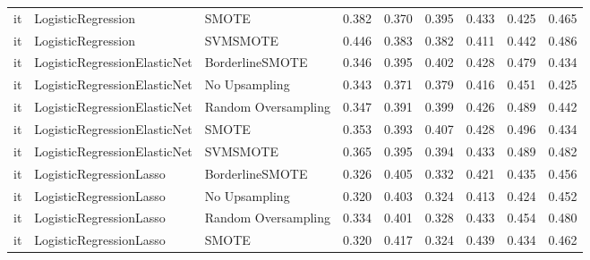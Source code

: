 \begin{tabular}{lllllllll}
      it &           LogisticRegression &               SMOTE & 0.382 &                     0.370 &                 0.395 &                  0.433 &                                   0.425 &     0.465 \\
      it &           LogisticRegression &            SVMSMOTE & 0.446 &                     0.383 &                 0.382 &                  0.411 &                                   0.442 &     0.486 \\
      it & LogisticRegressionElasticNet &     BorderlineSMOTE & 0.346 &                     0.395 &                 0.402 &                  0.428 &                                   0.479 &     0.434 \\
      it & LogisticRegressionElasticNet &       No Upsampling & 0.343 &                     0.371 &                 0.379 &                  0.416 &                                   0.451 &     0.425 \\
      it & LogisticRegressionElasticNet & Random Oversampling & 0.347 &                     0.391 &                 0.399 &                  0.426 &                                   0.489 &     0.442 \\
      it & LogisticRegressionElasticNet &               SMOTE & 0.353 &                     0.393 &                 0.407 &                  0.428 &                                   0.496 &     0.434 \\
      it & LogisticRegressionElasticNet &            SVMSMOTE & 0.365 &                     0.395 &                 0.394 &                  0.433 &                                   0.489 &     0.482 \\
      it &      LogisticRegressionLasso &     BorderlineSMOTE & 0.326 &                     0.405 &                 0.332 &                  0.421 &                                   0.435 &     0.456 \\
      it &      LogisticRegressionLasso &       No Upsampling & 0.320 &                     0.403 &                 0.324 &                  0.413 &                                   0.424 &     0.452 \\
      it &      LogisticRegressionLasso & Random Oversampling & 0.334 &                     0.401 &                 0.328 &                  0.433 &                                   0.454 &     0.480 \\
      it &      LogisticRegressionLasso &               SMOTE & 0.320 &                     0.417 &                 0.324 &                  0.439 &                                   0.434 &     0.462 \\

\end{tabular}
